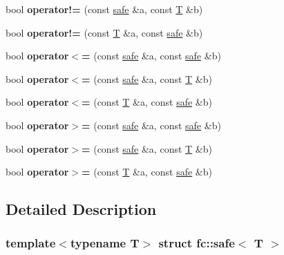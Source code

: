 \begin{DoxyCompactItemize}
bool {\bfseries operator!=} (const \mbox{\hyperlink{structfc_1_1safe}{safe}} \&a, const \mbox{\hyperlink{struct_t}{T}} \&b)
\item 
\mbox{\label{structfc_1_1safe_abc6a80900d34d01237b981ea976c94a8}} 
bool {\bfseries operator!=} (const \mbox{\hyperlink{struct_t}{T}} \&a, const \mbox{\hyperlink{structfc_1_1safe}{safe}} \&b)
\item 
\mbox{\label{structfc_1_1safe_ad6e5d8dbdd72dd886d8f3d443d609da2}} 
bool {\bfseries operator$<$=} (const \mbox{\hyperlink{structfc_1_1safe}{safe}} \&a, const \mbox{\hyperlink{structfc_1_1safe}{safe}} \&b)
\item 
\mbox{\label{structfc_1_1safe_ac87420c99a5943becf8d87698d66d098}} 
bool {\bfseries operator$<$=} (const \mbox{\hyperlink{structfc_1_1safe}{safe}} \&a, const \mbox{\hyperlink{struct_t}{T}} \&b)
\item 
\mbox{\label{structfc_1_1safe_ab81d1595f3d294ba014c1e2f7aead60a}} 
bool {\bfseries operator$<$=} (const \mbox{\hyperlink{struct_t}{T}} \&a, const \mbox{\hyperlink{structfc_1_1safe}{safe}} \&b)
\item 
\mbox{\label{structfc_1_1safe_a67037c5c209828dc12e923644d4d2e03}} 
bool {\bfseries operator$>$=} (const \mbox{\hyperlink{structfc_1_1safe}{safe}} \&a, const \mbox{\hyperlink{structfc_1_1safe}{safe}} \&b)
\item 
\mbox{\label{structfc_1_1safe_ae7ccb784e35f52b730c30e1cf843568a}} 
bool {\bfseries operator$>$=} (const \mbox{\hyperlink{structfc_1_1safe}{safe}} \&a, const \mbox{\hyperlink{struct_t}{T}} \&b)
\item 
\mbox{\label{structfc_1_1safe_a2e44c2248e439e3566908ae7c5898b86}} 
bool {\bfseries operator$>$=} (const \mbox{\hyperlink{struct_t}{T}} \&a, const \mbox{\hyperlink{structfc_1_1safe}{safe}} \&b)
\end{DoxyCompactItemize}


\subsection{Detailed Description}
\subsubsection*{template$<$typename T$>$\newline
struct fc\+::safe$<$ T $>$}

